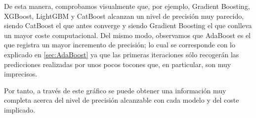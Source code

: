 \documentclass[12pt,twoside]{article}
\begin{document}
De esta manera, comprobamos visualmente que, por ejemplo, Gradient Boosting, XGBoost, LightGBM y CatBoost alcanzan un nivel de precisión muy parecido, siendo CatBoost el que antes converge y siendo Gradient Boosting el que conlleva un mayor coste computacional. Del mismo modo, observamos que AdaBoost es el que registra un mayor incremento de precisión; lo cual se corresponde con lo explicado en \ref{sec:AdaBoost} ya que las primeras iteraciones sólo recogerán las predicciones realizadas por unos pocos tocones que, en particular, son muy imprecisos.

Por tanto, a través de este gráfico se puede obtener una información muy completa acerca del nivel de precisión alcanzable con cada modelo y del coste implicado.











\newpage
\end{document}
